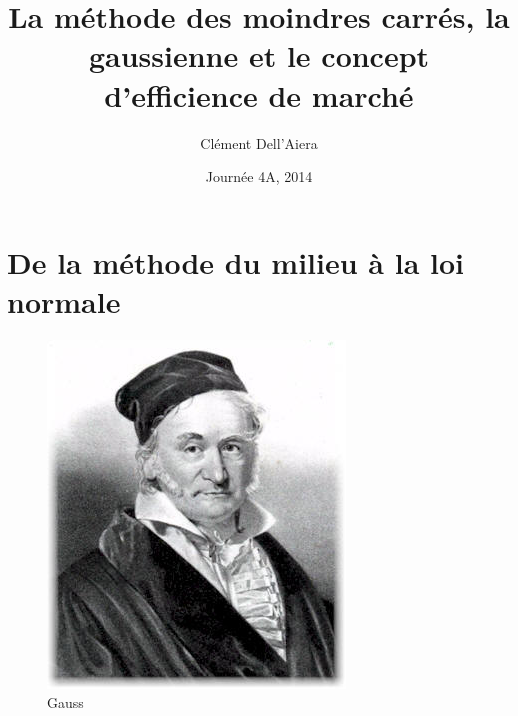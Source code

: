 \documentclass{beamer}
\title[Short Paper Title] %
{La méthode des moindres carrés, la gaussienne et le concept d'efficience de marché}
\author[Author, Another] %
{Clément Dell'Aiera}
\institute[Universities of Somewhere and Elsewhere] 
{ ENS Rennes
  }
\date[CFP 2003] %
{Journée 4A, 2014}
\begin{document}
\begin{frame}
  \titlepage
\end{frame}

\begin{frame}{}
  \tableofcontents
\end{frame}





\section{De la méthode du milieu à la loi normale}

\begin{frame}
\begin{figure}[!h]\centering
\includegraphics[scale=0.175]{Gauss2.jpg}
\caption{Gauss}
\label{fig:Gauss2}
\end{figure}
\end{frame}
\end{document}
